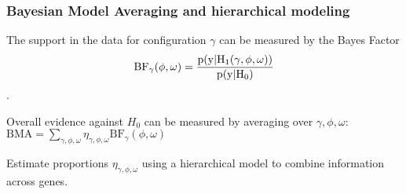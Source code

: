 \documentclass[ignorenonframetext]{beamer}
\def\BF{\text{BF}}
\def\BF{\rm BF}
\begin{document}
\begin{frame}
\frametitle{Bayesian Model Averaging and hierarchical modeling}

The support in the data for configuration $\gamma$ can be measured by the Bayes Factor
$$\BF_\gamma(\phi,\omega) = \frac{p(y | H_1(\gamma,\phi,\omega))}{p(y | H_0)}$$.

\bigskip

Overall evidence against $H_0$ can be measured by averaging over $\gamma, \phi, \omega$:
$\text{BMA} = \sum_{\gamma,\phi,\omega} \eta_{\gamma,\phi,\omega} \text{BF}_\gamma(\phi,\omega)$

\bigskip

Estimate proportions $\eta_{\gamma,\phi,\omega}$ using a hierarchical model to combine information across genes.


\end{frame}



\end{document}

